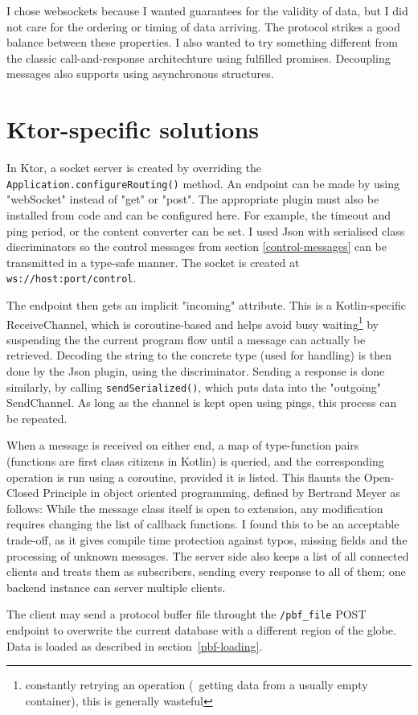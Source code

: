 I chose websockets because I wanted guarantees for the validity of data, but I did not care for the ordering or timing of data arriving. The protocol strikes a good balance between these properties. I also wanted to try something different from the classic call-and-response architechture using fulfilled promises. Decoupling messages also supports using asynchronous structures.

\section{Ktor-specific solutions}

In Ktor, a socket server is created by overriding the \verb|Application.configureRouting()| method. An endpoint can be made by using "webSocket" instead of "get" or "post". The appropriate plugin must also be installed from code and can be configured here. For example, the timeout and ping period, or the content converter can be set. I used Json with serialised class discriminators so the control messages from section \ref{control-messages} can be transmitted in a type-safe manner. The socket is created at \verb|ws://host:port/control|.

The endpoint then gets an implicit "incoming" attribute. This is a Kotlin-specific ReceiveChannel, which is coroutine-based and helps avoid busy waiting\footnote{constantly retrying an operation (\eg~getting data from a usually empty container), this is generally wasteful} by suspending the the current program flow until a message can actually be retrieved. Decoding the string to the concrete type (used for handling) is then done by the Json plugin, using the discriminator. Sending a response is done similarly, by calling \verb|sendSerialized()|, which puts data into the "outgoing" SendChannel. As long as the channel is kept open using pings, this process can be repeated.

When a message is received on either end, a map of type-function pairs (functions are first class citizens in Kotlin) is queried, and the corresponding operation is run using a coroutine, provided it is listed. This flaunts the Open-Closed Principle in object oriented programming, defined by Bertrand Meyer\cite{OOSC-OCP} as follows:  While the message class itself is open to extension, any modification requires changing the list of callback functions. I found this to be an acceptable trade-off, as it gives compile time protection against typos, missing fields and the processing of unknown messages. The server side also keeps a list of all connected clients and treats them as subscribers, sending every response to all of them; one backend instance can server multiple clients.

The client may send a protocol buffer file throught the \verb|/pbf_file| POST endpoint to overwrite the current database with a different region of the globe. Data is loaded as described in section~\ref{pbf-loading}.